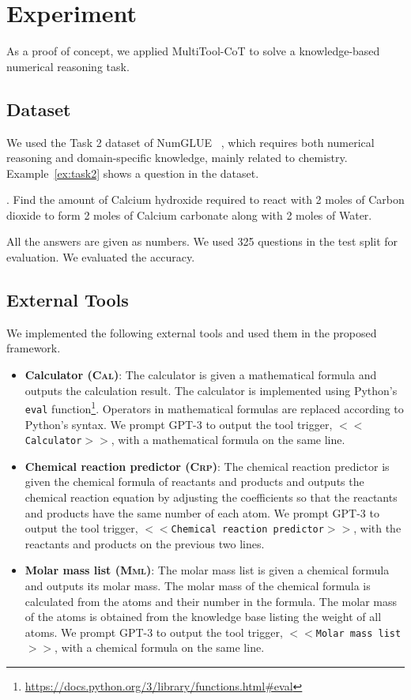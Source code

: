 \section{Experiment}

As a proof of concept, we applied MultiTool-CoT to solve a knowledge-based numerical reasoning task.

\subsection{Dataset}
We used the Task 2 dataset of NumGLUE ~\cite{mishra-etal-2022-numglue}, which requires both numerical reasoning and domain-specific knowledge, mainly related to chemistry.
Example~\ref{ex:task2} shows a question in the dataset.

\ex. \label{ex:task2}
Find the amount of Calcium hydroxide required to react with 2 moles of Carbon dioxide to form 2 moles of Calcium carbonate along with 2 moles of Water.

All the answers are given as numbers.
We used 325 questions in the test split for evaluation.
We evaluated the accuracy.

\subsection{External Tools}
\label{sec:application}

We implemented the following external tools and used them in the proposed framework.

\begin{itemize}
    \item \textbf{Calculator (\textsc{Cal})}:
        The calculator is given a mathematical formula and outputs the calculation result.
        The calculator is implemented using Python's \texttt{eval} function\footnote{\url{https://docs.python.org/3/library/functions.html\#eval}}.
        Operators in mathematical formulas are replaced according to Python's syntax.
        We prompt GPT-3 to output the tool trigger, \texttt{$<<$Calculator$>>$}, with a mathematical formula on the same line.
        
    \item \textbf{Chemical reaction predictor (\textsc{Crp})}:
        The chemical reaction predictor is given the chemical formula of reactants and products and outputs the chemical reaction equation by adjusting the coefficients so that the reactants and products have the same number of each atom.
        We prompt GPT-3 to output the tool trigger, \texttt{$<<$Chemical reaction predictor$>>$}, with the reactants and products on the previous two lines.
        
    \item \textbf{Molar mass list (\textsc{Mml})}:
        The molar mass list is given a chemical formula and outputs its molar mass.
        The molar mass of the chemical formula is calculated from the atoms and their number in the formula.
        The molar mass of the atoms is obtained from the knowledge base listing the weight of all atoms.
        We prompt GPT-3 to output the tool trigger, \texttt{$<<$Molar mass list$>>$}, with a chemical formula on the same line.
\end{itemize}

